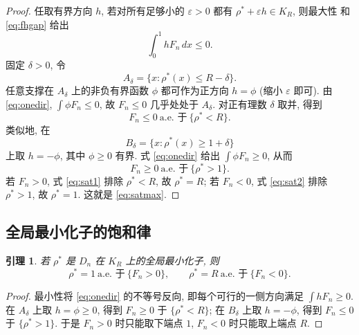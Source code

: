 \documentclass[UTF8]{ctexart}
\newtheorem{lemma}[theorem]{引理}
\begin{document}
\begin{proof}
任取有界方向 $h$, 若对所有足够小的 $\varepsilon>0$ 都有 $\rho^*+\varepsilon h\in K_R$, 则最大性
和 \eqref{eq:fhgap} 给出
\begin{equation}
	\int_0^1 hF_n\,dx\le0 .
	\label{eq:onedir}
\end{equation}
固定 $\delta>0$, 令
\begin{equation*}
	A_\delta=\{x:\rho^*(x)\le R-\delta\}.
\end{equation*}
任意支撑在 $A_\delta$ 上的非负有界函数 $\phi$ 都可作为正方向 $h=\phi$ (缩小 $\varepsilon$ 即可).
由 \eqref{eq:onedir}, $\int\phi F_n\le0$, 故 $F_n\le0$ 几乎处处于 $A_\delta$. 对正有理数
$\delta$ 取并, 得到
\begin{equation}
	F_n\le0\ \text{a.e. 于}\ \{\rho^*<R\} .
	\label{eq:sat1}
\end{equation}
类似地, 在
\begin{equation*}
	B_\delta=\{x:\rho^*(x)\ge1+\delta\}
\end{equation*}
上取 $h=-\phi$, 其中 $\phi\ge0$ 有界. 式 \eqref{eq:onedir} 给出 $\int\phi F_n\ge0$, 从而
\begin{equation}
	F_n\ge0\ \text{a.e. 于}\ \{\rho^*>1\} .
	\label{eq:sat2}
\end{equation}
若 $F_n>0$, 式 \eqref{eq:sat1} 排除 $\rho^*<R$, 故 $\rho^*=R$; 若 $F_n<0$, 式 \eqref{eq:sat2}
排除 $\rho^*>1$, 故 $\rho^*=1$. 这就是 \eqref{eq:satmax}.
\end{proof}

\subsection{全局最小化子的饱和律}

\begin{lemma}\label{lem:satmin}
若 $\rho^*$ 是 $D_n$ 在 $K_R$ 上的全局最小化子, 则
\begin{equation}
	\rho^*=1\ \text{a.e. 于}\ \{F_n>0\},\qquad
	\rho^*=R\ \text{a.e. 于}\ \{F_n<0\} .
	\label{eq:satmin}
\end{equation}
\end{lemma}

\begin{proof}
最小性将 \eqref{eq:onedir} 的不等号反向, 即每个可行的一侧方向满足 $\int hF_n\ge0$. 在
$A_\delta$ 上取 $h=\phi\ge0$, 得到 $F_n\ge0$ 于 $\{\rho^*<R\}$; 在 $B_\delta$ 上取 $h=-\phi$,
得到 $F_n\le0$ 于 $\{\rho^*>1\}$. 于是 $F_n>0$ 时只能取下端点 $1$, $F_n<0$ 时只能取上端点
$R$.
\end{proof}
\end{document}
